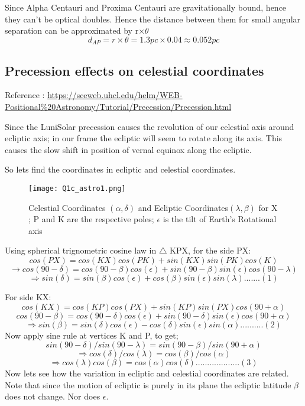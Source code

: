 \documentclass[11pt]{article}
\begin{document}
	Since Alpha Centauri and Proxima Centauri are gravitationally bound, hence they can't be optical doubles. Hence the distance between them for small angular separation can be approximated by r$\times \theta$ 
	\[
	d_{AP} = r \times \theta = 1.3 pc \times 0.04 \approx 0.052 pc   		
	\]
	
	\subsection{Precession effects on celestial coordinates}
	Reference : \url{https://sceweb.uhcl.edu/helm/WEB-Positional%20Astronomy/Tutorial/Precession/Precession.html}
		
		Since the LuniSolar precession causes the revolution of our celestial axis around ecliptic axis; in our frame the ecliptic will seem to rotate along its axis. This causes the slow shift in position of vernal equinox along the ecliptic.
		
		So lets find the coordinates in ecliptic and celestial coordinates.
		
		\begin{figure}[h]
			\centering\texttt{[image: Q1c\_astro1.png]}
			\caption{Celestial Coordinates $(\alpha, \delta)$ and Ecliptic Coordinates$(\lambda, \beta)$ for X ; P and K are the respective poles; $\epsilon$ is the tilt of Earth's Rotational axis} 
			\label{fig:figure1}
		\end{figure}
		
		Using spherical trignometric cosine law in $\triangle$ KPX, for the side PX:
		\[
		cos(PX) = cos(KX)cos(PK) + sin(KX)sin(PK)cos(K)
		\]
		\[
		\rightarrow cos(90 -\delta) = cos(90-\beta)cos(\epsilon) + sin(90-\beta)sin(\epsilon)cos(90-\lambda) 
		\]
		\[
		\Rightarrow sin(\delta) = sin(\beta)cos(\epsilon) + cos(\beta)sin(\epsilon)sin(\lambda).......(1)
		\]
		
		For side KX:
		\[
		cos(KX) = cos(KP)cos(PX) + sin(KP)sin(PX)cos(90 + \alpha)
		\]
		\[
		cos(90 - \beta) = cos(90 - \delta)cos(\epsilon) + sin(90 - \delta)sin(\epsilon)cos(90 + \alpha)
		\]
		\[
		\Rightarrow sin(\beta) = sin(\delta)cos(\epsilon) - cos(\delta)sin(\epsilon)sin(\alpha)..........(2)
		\]
		Now apply sine rule at vertices K and P, to get;
		\[
		sin(90-\delta)/sin(90-\lambda) = sin(90-\beta)/sin(90+\alpha)
		\]
		\[
		\Rightarrow cos(\delta)/cos(\lambda) = cos(\beta)/cos(\alpha)			
		\]
		\[
		\Rightarrow cos(\lambda)cos(\beta) = cos(\alpha)cos(\delta)...................(3)
		\]
		Now lets see how the variation in ecliptic and celestial coordinates are related. Note that since the motion of ecliptic is purely in its plane the ecliptic latitude $\beta$ does not change. Nor does $\epsilon$.
		
\end{document}
